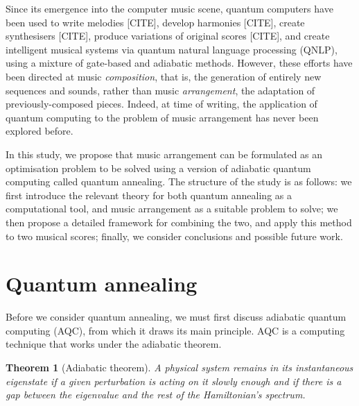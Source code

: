 \documentclass[12pt]{article}
\newtheorem*{theorem}{Theorem}
\theoremstyle{definition}
\begin{document}
Since its emergence into the computer music scene, quantum computers have been used to write melodies [CITE], develop harmonies [CITE], create synthesisers [CITE], produce variations of original scores [CITE], and create intelligent musical systems via quantum natural language processing (QNLP), using a mixture of gate-based and adiabatic methods. However, these efforts have been directed at music \emph{composition}, that is, the generation of entirely new sequences and sounds, rather than music \emph{arrangement}, the adaptation of previously-composed pieces. Indeed, at time of writing, the application of quantum computing to the problem of music arrangement has never been explored before.

In this study, we propose that music arrangement can be formulated as an optimisation problem to be solved using a version of adiabatic quantum computing called quantum annealing.
The structure of the study is as follows: we first introduce the relevant theory for both quantum annealing as a computational tool, and music arrangement as a suitable problem to solve; we then propose a detailed framework for combining the two, and apply this method to two musical scores; finally, we consider conclusions and possible future work.

\section{Quantum annealing}

Before we consider quantum annealing, we must first discuss adiabatic quantum computing (AQC), from which it draws its main principle. AQC is a computing technique that works under the adiabatic theorem.

\begin{theorem}[Adiabatic theorem]
    A physical system remains in its instantaneous eigenstate if a given perturbation is acting on it slowly enough and if there is a gap between the eigenvalue and the rest of the Hamiltonian's spectrum. \cite{born_beweis_1928}
    \label{thm:adiabatic}
\end{theorem}
\end{document}
